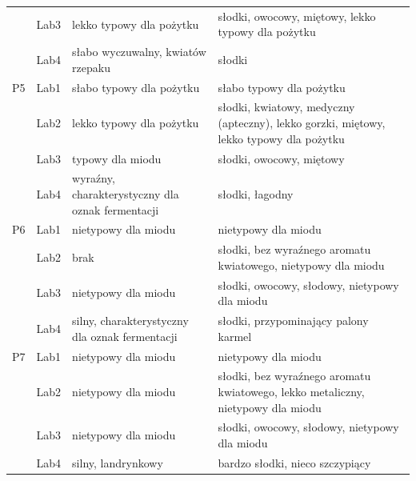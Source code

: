 {\begin{longtable}{@{}lc>{\raggedright\arraybackslash}p{5.2cm}>{\raggedright\arraybackslash}p{5.6cm}@{}}
 & Lab3 & lekko typowy dla pożytku & słodki, owocowy, miętowy, lekko typowy dla pożytku \\
 & Lab4 & słabo wyczuwalny, kwiatów rzepaku & słodki \\
\midrule
P5
 & Lab1 & słabo typowy dla pożytku & słabo typowy dla pożytku \\
 & Lab2 & lekko typowy dla pożytku & słodki, kwiatowy, medyczny (apteczny), lekko gorzki, miętowy, lekko typowy dla pożytku \\
 & Lab3 & typowy dla miodu & słodki, owocowy, miętowy \\
 & Lab4 & wyraźny, charakterystyczny dla oznak fermentacji & słodki, łagodny \\
\midrule
P6
 & Lab1 & nietypowy dla miodu & nietypowy dla miodu \\
 & Lab2 & brak & słodki, bez wyraźnego aromatu kwiatowego, nietypowy dla miodu \\
 & Lab3 & nietypowy dla miodu & słodki, owocowy, słodowy, nietypowy dla miodu \\
 & Lab4 & silny, charakterystyczny dla oznak fermentacji & słodki, przypominający palony karmel \\
\midrule
P7
 & Lab1 & nietypowy dla miodu & nietypowy dla miodu \\
 & Lab2 & nietypowy dla miodu & słodki, bez wyraźnego aromatu kwiatowego, lekko metaliczny, nietypowy dla miodu \\
 & Lab3 & nietypowy dla miodu & słodki, owocowy, słodowy, nietypowy dla miodu \\
 & Lab4 & silny, landrynkowy & bardzo słodki, nieco szczypiący \\
\end{longtable}
}
